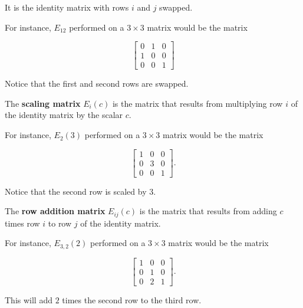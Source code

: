 \documentclass{ximera}
\begin{document}
\begin{exploration}
\begin{example}
\begin{remark}
\begin{definition}
    It is the identity matrix with rows $i$ and $j$ swapped.

    For instance, $E_{12}$ performed on a $3\times 3$ matrix would be the matrix

    \begin{equation*}
      \begin{bmatrix}
        0 & 1 & 0 \\
        1 & 0 & 0 \\
        0 & 0 & 1
      \end{bmatrix}
    \end{equation*}

    Notice that the first and second rows are swapped.
  \end{definition}

  \begin{definition}
    The \textbf{scaling matrix} $E_{i}(c)$ is the matrix that results from multiplying row $i$ of the identity matrix by the scalar $c$.

    For instance, $E_{2}(3)$ performed on a $3\times 3$ matrix would be the matrix

    \begin{equation*}
      \begin{bmatrix}
        1 & 0 & 0 \\
        0 & 3 & 0 \\
        0 & 0 & 1
      \end{bmatrix}.
    \end{equation*}

    Notice that the second row is scaled by $3$.
  \end{definition}

  \begin{definition}
    The \textbf{row addition matrix} $E_{ij}(c)$ is the matrix that results from adding $c$ times row $i$ to row $j$ of the identity matrix.

    For instance, $E_{3,2}(2)$ performed on a $3\times 3$ matrix would be the matrix

    \begin{equation*}
      \begin{bmatrix}
        1 & 0 & 0 \\
        0 & 1 & 0 \\
        0 & 2 & 1
      \end{bmatrix}.
    \end{equation*}

    This will add $2$ times the second row to the third row.
  \end{definition}


\end{remark}
\end{example}
\end{exploration}
\end{document}
